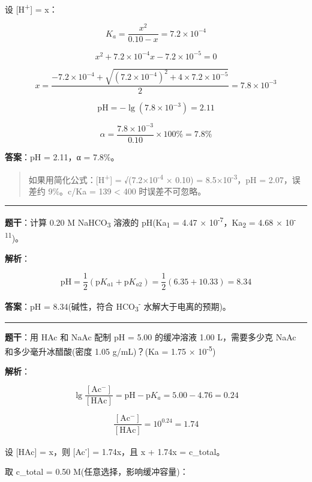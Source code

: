 设 {[}H\textsuperscript{+}{]} = x：

\[K_a = \frac{x^2}{0.10 - x} = 7.2 \times 10^{-4}\]

\[x^2 + 7.2 \times 10^{-4} x - 7.2 \times 10^{-5} = 0\]

\[x = \frac{-7.2 \times 10^{-4} + \sqrt{(7.2 \times 10^{-4})^2 + 4 \times 7.2 \times 10^{-5}}}{2} = 7.8 \times 10^{-3}\]

\[\mathrm{pH} = -\lg(7.8 \times 10^{-3}) = 2.11\]

\[\alpha = \frac{7.8 \times 10^{-3}}{0.10} \times 100\% = 7.8\%\]

\textbf{答案}：pH = 2.11，α = 7.8\%。

\begin{quote}
如果用简化公式：{[}H\textsuperscript{+}{]} = √(7.2×10\textsuperscript{-4} × 0.10) = 8.5×10\textsuperscript{-3}，pH = 2.07，误差约 9\%。c/Ka = 139 \textless{} 400 时误差不可忽略。
\end{quote}

\begin{center}\rule{0.5\linewidth}{0.5pt}\end{center}

\textbf{题干}：计算 0.20 M NaHCO\textsubscript{3} 溶液的 pH(Ka\textsubscript{1} = 4.47 × 10\textsuperscript{-7}，Ka\textsubscript{2} = 4.68 × 10\textsuperscript{-11})。

\textbf{解析}：

\[\mathrm{pH} = \frac{1}{2}(\mathrm{p}K_{a1} + \mathrm{p}K_{a2}) = \frac{1}{2}(6.35 + 10.33) = 8.34\]

\textbf{答案}：pH = 8.34(碱性，符合 HCO\textsubscript{3}\textsuperscript{-} 水解大于电离的预期)。

\begin{center}\rule{0.5\linewidth}{0.5pt}\end{center}

\textbf{题干}：用 HAc 和 NaAc 配制 pH = 5.00 的缓冲溶液 1.00 L，需要多少克 NaAc 和多少毫升冰醋酸(密度 1.05 g/mL)？(Ka = 1.75 × 10\textsuperscript{-5})

\textbf{解析}：

\[\lg\frac{[\mathrm{Ac^-}]}{[\mathrm{HAc}]} = \mathrm{pH} - \mathrm{p}K_a = 5.00 - 4.76 = 0.24\]

\[\frac{[\mathrm{Ac^-}]}{[\mathrm{HAc}]} = 10^{0.24} = 1.74\]

设 {[}HAc{]} = x，则 {[}Ac\textsuperscript{-}{]} = 1.74x，且 x + 1.74x = c\_total。

取 c\_total = 0.50 M(任意选择，影响缓冲容量)：

